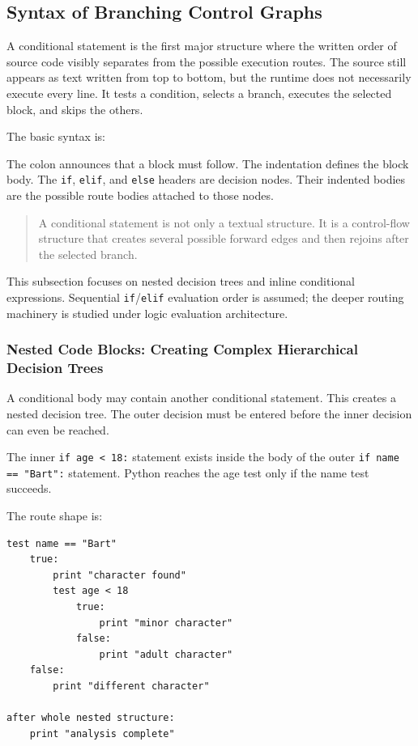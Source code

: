 \subsection{Syntax of Branching Control Graphs}

A conditional statement is the first major structure where the written order of source code visibly separates from the possible execution routes. The source still appears as text written from top to bottom, but the runtime does not necessarily execute every line. It tests a condition, selects a branch, executes the selected block, and skips the others.

The basic syntax is:

The colon announces that a block must follow. The indentation defines the block body. The \texttt{if}, \texttt{elif}, and \texttt{else} headers are decision nodes. Their indented bodies are the possible route bodies attached to those nodes.

\begin{quote}
A conditional statement is not only a textual structure. It is a control-flow structure that creates several possible forward edges and then rejoins after the selected branch.
\end{quote}

This subsection focuses on nested decision trees and inline conditional expressions. Sequential \texttt{if}/\texttt{elif} evaluation order is assumed; the deeper routing machinery is studied under logic evaluation architecture.

\subsubsection{Nested Code Blocks: Creating Complex Hierarchical Decision Trees}

A conditional body may contain another conditional statement. This creates a nested decision tree. The outer decision must be entered before the inner decision can even be reached.

The inner \texttt{if age < 18:} statement exists inside the body of the outer \texttt{if name == "Bart":} statement. Python reaches the age test only if the name test succeeds.

The route shape is:

\begin{verbatim}
test name == "Bart"
    true:
        print "character found"
        test age < 18
            true:
                print "minor character"
            false:
                print "adult character"
    false:
        print "different character"

after whole nested structure:
    print "analysis complete"
\end{verbatim}

